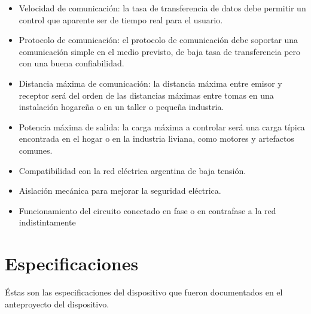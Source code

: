  \begin{itemize}

 \item Velocidad de comunicación: la tasa de transferencia de datos debe permitir un control que aparente ser de tiempo real para el usuario.

 \item Protocolo de comunicación: el protocolo de comunicación debe soportar una comunicación simple en el medio previsto, de baja tasa de transferencia pero con una buena confiabilidad.

 \item Distancia máxima de comunicación: la distancia máxima entre emisor y receptor será del orden de las distancias máximas entre tomas en una instalación hogareña o en un taller o pequeña industria. 

 \item Potencia máxima de salida: la carga máxima a controlar será una carga típica encontrada en el hogar o en la industria liviana, como motores y artefactos comunes.
 
 \item Compatibilidad con la red eléctrica argentina de baja tensión.
 
 \item Aislación mecánica para mejorar la seguridad eléctrica.

\item Funcionamiento del circuito conectado en fase o en contrafase a la red indistintamente


 \end{itemize}

\section{Especificaciones}
Éstas son las especificaciones del dispositivo que fueron documentados en el anteproyecto del dispositivo.



 
 
